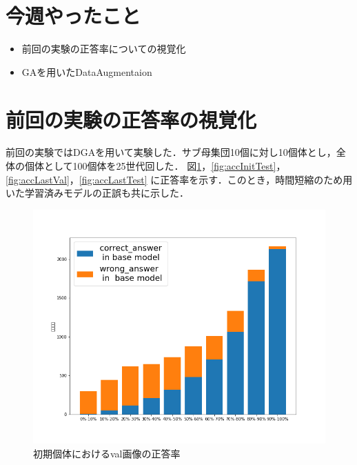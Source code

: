 \documentclass[twocolumn]{jarticle}     %
\begin{document}


\section{今週やったこと}
\begin{itemize}
	\item 前回の実験の正答率についての視覚化
 	\item GAを用いたDataAugmentaion
\end{itemize}

\section{前回の実験の正答率の視覚化}
前回の実験ではDGAを用いて実験した．サブ母集団10個に対し10個体とし，全体の個体として100個体を25世代回した．
図\ref{fig:accInitVal}，\ref{fig:accInitTest}，\ref{fig:accLastVal}，\ref{fig:accLastTest}
に正答率を示す．このとき，時間短縮のため用いた学習済みモデルの正誤も共に示した．

\begin{figure}[h]
	\centering
	\includegraphics[scale=0.3]{graph_val_init.png}
	\caption{初期個体におけるval画像の正答率\label{fig:accInitVal}}
\end{figure}
\end{document}
